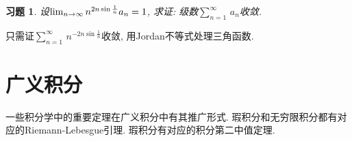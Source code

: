 \documentclass[11pt,a4paper]{ctexart}
\makeatletter
\theoremstyle{thmseries} %
\newtheorem{thm}{定理}[section]
\theoremstyle{exerseries}
\newtheorem{exer}{习题}[section]
\renewenvironment{proof}[1][\proofname]{\par
  \pushQED{\qed}%
  \normalfont \topsep6\p@\@plus6\p@\relax
  \trivlist
  \item[\hskip\labelsep
        \itshape
    #1\@addpunct{}]\ignorespaces
}{%
  \popQED\endtrivlist\@endpefalse
}
\newenvironment{pf}{\begin{proof}[\bfseries\upshape 证\quad]}{\end{proof}}
\newcommand{\bra}[1]{\mathopen{}\left(#1\right)}
\newcommand{\sbra}[1]{\mathopen{}\left[#1\right]}
\renewcommand{\d}{\mathrm{d}}
\def \nti {\mathnormal{n}\to\infty}
\def \tseries {{\textstyle\sum\limits_{n=1}^{\infty}}\,} %
\def \dseries {\sum_{n=1}^{\infty}\,} %
\makeatother
\begin{document}
\begin{exer}
	设$\lim_{\nti}n^{2n\sin\frac{1}{n}}a_n=1$, 求证: 级数$\tseries a_n$收敛. 
\end{exer}
\begin{pf}
	只需证$\tseries n^{-2n\sin\frac{1}{n}}$收敛, 用Jordan不等式处理三角函数. 
\end{pf}


\section{广义积分}
一些积分学中的重要定理在广义积分中有其推广形式. 瑕积分和无穷限积分都有对应的Riemann-Lebesgue引理. 瑕积分有对应的积分第二中值定理. 




\end{document}
